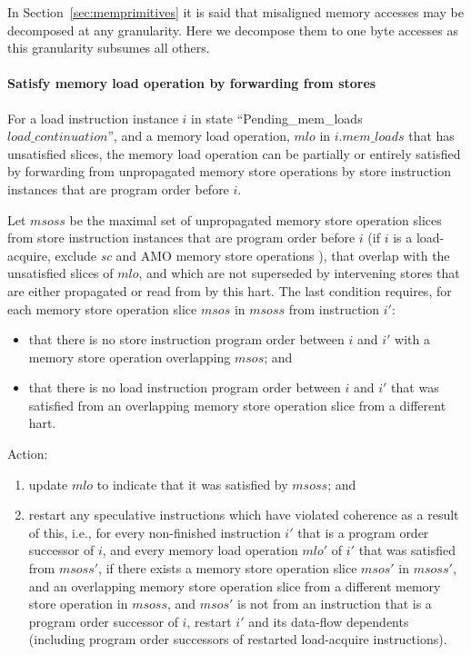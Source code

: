 \begin{commentary}
In Section~\ref{sec:memprimitives} it is said that misaligned memory accesses may be decomposed at any granularity.
Here we decompose them to one byte accesses as this granularity subsumes all others.
\end{commentary}

\paragraph{Satisfy memory load operation by forwarding from stores}\label{omm:hart:sat_by_forwarding}
For a load instruction instance $i$ in state ``{\sc Pending\_mem\_loads} $load\_continuation$'', and a memory load operation, $mlo$ in $i.mem\_loads$ that has unsatisfied slices, the memory load operation can be partially or entirely satisfied by forwarding from unpropagated memory store operations by store instruction instances that are program order before $i$.

Let $msoss$ be the maximal set of unpropagated memory store operation slices from store instruction instances that are program order before $i$ (if $i$ is a load-acquire, exclude {\em sc} and AMO memory store operations ), that overlap with the unsatisfied slices of $mlo$, and which are not superseded by intervening stores that are either propagated or read from by this hart.
The last condition requires, for each memory store operation slice $msos$ in $msoss$ from instruction $i'$:
\begin{itemize}
\item that there is no store instruction program order between $i$ and $i'$ with a memory store operation overlapping $msos$; and
\item that there is no load instruction program order between $i$ and $i'$ that was satisfied from an overlapping memory store operation slice from a different hart.
\end{itemize}
Action:
\begin{enumerate}
\item update $mlo$ to indicate that it was satisfied by $msoss$; and
\item restart any speculative instructions which have violated coherence as a result of this, i.e., for every non-finished instruction $i'$ that is a program order successor of $i$, and every memory load operation $mlo'$ of $i'$ that was satisfied from $msoss'$, if there exists a memory store operation slice $msos'$ in $msoss'$, and an overlapping memory store operation slice from a different memory store operation in $msoss$, and $msos'$ is not from an instruction that is a program order successor of $i$, restart $i'$ and its data-flow dependents (including program order successors of restarted load-acquire instructions).
\end{enumerate}

